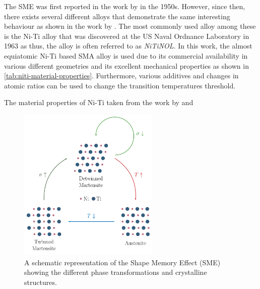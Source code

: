 The SME was first reported in the work by \cite{changPlasticDeformationDiffusionless1951} in the 1950s. However, since then, there exists several different alloys that demonstrate the same interesting behaviour as shown in the work by \cite{WAYMAN19903}. The most commonly used alloy among these is the Ni-Ti alloy that was discovered at the US Naval Ordnance Laboratory in 1963 as thus, the alloy is often referred to as \textit{NiTiNOL}. In this work, the almost equiatomic Ni-Ti based SMA alloy is used due to its commercial availability in various different geometries and its excellent mechanical properties as shown in \cref{tab:niti-material-properties}. Furthermore, various additives and changes in atomic ratios can be used to change the transition temperatures threshold.

\begin{table}[hbt]
    \centering
    \caption{The material properties of Ni-Ti taken from the work by \cite{duerigTiNiShapeMemory1994} and \cite{raoDesignShapeMemory2015}}
    \label{tab:niti-material-properties}
    
\end{table}

\begin{figure}[hbt]
    \centering
    \includegraphics[width=0.6\textwidth]{images/chap2/sma-phases.pdf}
    \caption{A schematic representation of the Shape Memory Effect (SME) showing the different phase transformations and crystalline structures.}
    \label{fig:sma-phases}
\end{figure}

